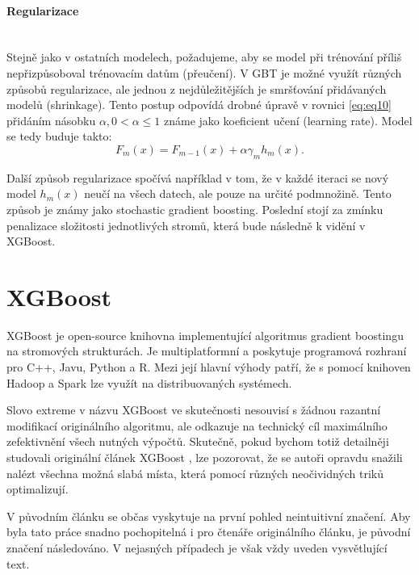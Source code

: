 \documentclass[a4paper]{article}
\begin{document}
\paragraph{Regularizace} \mbox{} \\
Stejně jako v ostatních modelech, požadujeme, aby se model při trénování příliš nepřizpůsoboval trénovacím datům (přeučení). V GBT je možné využít různých způsobů regularizace, ale jednou z nejdůležitějších je smršťování přidávaných modelů (shrinkage). Tento postup odpovídá drobné úpravě v rovnici \eqref{eq:eq10} přidáním násobku $\alpha, 0 < \alpha \leq 1$ známe jako koeficient učení (learning rate). Model se tedy buduje takto:
    \begin{equation}
        F_m(x) = F_{m-1}(x) + \alpha \gamma_m h_m(x).
    \end{equation}

Další způsob regularizace spočívá například v tom, že v každé iteraci se nový model $h_m(x)$ neučí na všech datech, ale pouze na určité podmnožině. Tento způsob je známy jako stochastic gradient boosting. Poslední stojí za zmínku penalizace složitosti jednotlivých stromů, která bude následně k vidění v XGBoost.

\section{XGBoost}
XGBoost je open-source knihovna implementující algoritmus gradient boostingu na stromových strukturách. Je multiplatformní a poskytuje programová rozhraní pro C++, Javu, Python a R. Mezi její hlavní výhody patří, že s pomocí knihoven Hadoop a Spark lze využít na distribuovaných systémech.

Slovo extreme v názvu XGBoost ve skutečnosti nesouvisí s žádnou razantní modifikací originálního algoritmu, ale odkazuje na technický cíl maximálního zefektivnění všech nutných výpočtů. Skutečně, pokud bychom totiž detailněji studovali originální článek XGBoost \cite{DBLP:journals/corr/ChenG16}, lze pozorovat, že se autoři opravdu snažili nalézt všechna možná slabá místa, která pomocí různých neočividných triků optimalizují. 

V původním článku se občas vyskytuje na první pohled neintuitivní značení. Aby byla tato práce snadno pochopitelná i pro čtenáře originálního článku, je původní značení následováno. V nejasných případech je však vždy uveden vysvětlující text. 
\end{document}
